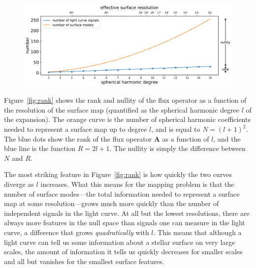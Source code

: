 \documentclass[modern]{aastex62}
\begin{document}
\begin{figure}[t!]
    \begin{centering}
        \includegraphics[width=\linewidth]{figures/rank.pdf}
    \end{centering}
\end{figure}

Figure~\ref{fig:rank} shows the rank and nullity of the flux operator
as a function of the resolution of the surface map (quantified as the
spherical harmonic degree $l$ of the expansion). The orange
curve is the number of spherical harmonic coefficients needed to
represent a surface map up to degree $l$, and is equal to $N = (l + 1)^2$.
The blue dots show the rank of the flux operator $\mathbf{A}$ as a function
of $l$, and the blue line is the function $R = 2l + 1$. The nullity is
simply the difference between $N$ and $R$.

The most striking feature in Figure~\ref{fig:rank} is how quickly the two
curves diverge as $l$ increases. What this means for the mapping problem
is that the number of surface modes---the total information needed to
represent a surface map at some resolution---grows much more quickly than the
number of independent signals in the light curve.
%
At all but the lowest resolutions, there are always more features in the
null space than signals one can measure in the light curve, a difference
that grows \emph{quadratically} with $l$.
%
This means that although a light curve can tell us some information about
a stellar surface on very large scales, the amount of information it tells
us quickly decreases for smaller scales and all but vanishes for the smallest
surface features.
\end{document}
